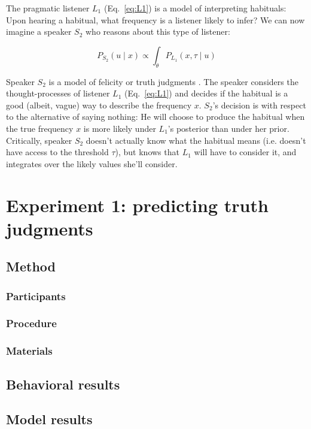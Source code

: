 \documentclass[10pt,letterpaper]{article}
\begin{document}
The pragmatic listener $L_1$ (Eq.~\ref{eq:L1}) is a model of interpreting habituals: Upon hearing a habitual, what frequency is a listener likely to infer?
We can now imagine a speaker $S_2$ who reasons about this type of listener: 

\begin{equation} 
P_{S_{2}}(u \mid x) \propto  \int_{\theta} P_{L_{1}}(x , \tau \mid u)
\label{eq:S2}
\end{equation}

Speaker $S_2$ is a model of felicity or truth judgments \cite{Degen2014, TesslerUnderReview}.
The speaker considers the thought-processes of listener $L_1$ (Eq.~\ref{eq:L1}) and decides if the habitual is a good (albeit, vague) way to describe the frequency $x$. 
$S_2$'s decision is with respect to the alternative of saying nothing: He will choose to produce the habitual when the true frequency $x$ is more likely under $L_1$'s posterior than under her prior. 
Critically, speaker $S_{2}$ doesn't actually know what the habitual means (i.e. doesn't have access to the threshold $\tau$), but knows that $L_{1}$ will have to consider it, and integrates over the likely values she'll consider.


\section{Experiment 1: predicting truth judgments}




\subsection{Method}
\subsubsection{Participants}
\subsubsection{Procedure}
\subsubsection{Materials}

\subsection{Behavioral results}

\subsection{Model results}
\end{document}
